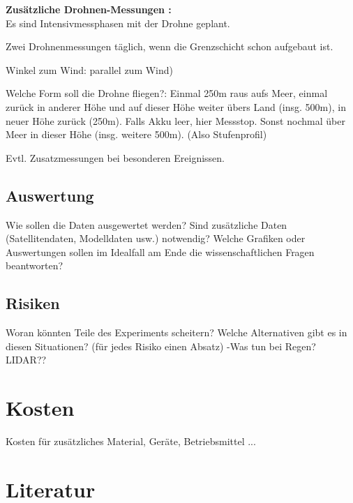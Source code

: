 \documentclass[a4paper,11pt,DIV=calc,tablecaptionabove,headinclude,twoside]{article}
\begin{document}
\textbf{Zusätzliche Drohnen-Messungen :}\\
Es sind Intensivmessphasen mit der Drohne geplant.
\item Zwei Drohnenmessungen täglich, wenn die Grenzschicht schon aufgebaut ist.
\item Winkel zum Wind: parallel zum Wind)
\item Welche Form soll die Drohne fliegen?: Einmal 250m raus aufs Meer, einmal zurück in anderer Höhe und auf dieser Höhe weiter übers Land (insg. 500m), in neuer Höhe zurück (250m). Falls Akku leer, hier Messstop. Sonst nochmal über Meer in dieser Höhe (insg. weitere 500m). (Also Stufenprofil)
\item Evtl. Zusatzmessungen bei besonderen Ereignissen.
\subsection{Auswertung}
Wie sollen die Daten ausgewertet werden? Sind zusätzliche Daten (Satellitendaten, Modelldaten usw.) notwendig? Welche Grafiken oder Auswertungen sollen im Idealfall am Ende die wissenschaftlichen Fragen beantworten?

\subsection{Risiken}
Woran könnten Teile des Experiments scheitern? Welche Alternativen gibt es in diesen Situationen? (für jedes Risiko einen Absatz)
-Was tun bei Regen? LIDAR??
\section{Kosten}
Kosten für zusätzliches Material, Geräte, Betriebsmittel ...

\section*{Literatur}
\end{document}
